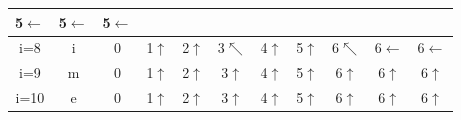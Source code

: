 \documentclass{article}
\begin{document}
\begin{multicols*}{2}
\begin{tabular}{|c|c|c|c|c|c|c|c|c|c|c|}
        5$\leftarrow$                  &
        5$\leftarrow$                  &
        5$\leftarrow$                                                            \\
        \hline
        i=8                            & i                             & 0   &
        1$\uparrow$                    &
        2$\uparrow$                    &
        3$\nwarrow$                    & 4$\uparrow$
                                       & 5$\uparrow$                   &
        \cellcolor{red!25}6$\nwarrow$  &
        6$\leftarrow$                  &
        6$\leftarrow$                                                            \\
        \hline
        i=9                            & m                             & 0   &
        1$\uparrow$                    &
        2$\uparrow$                    &
        3$\uparrow$                    & 4$\uparrow$
                                       & 5$\uparrow$                   &
        6$\uparrow$                    &
        6$\uparrow$                    &
        6$\uparrow$                                                              \\
        \hline
        i=10                           & e                             & 0   &
        1$\uparrow$                    &
        2$\uparrow$                    &
        3$\uparrow$                    & 4$\uparrow$
                                       & 5$\uparrow$                   &
        6$\uparrow$                    &
        6$\uparrow$                    &
        6$\uparrow$                                                              \\
        \hline
    \end{tabular}


\end{multicols*}
\end{document}
